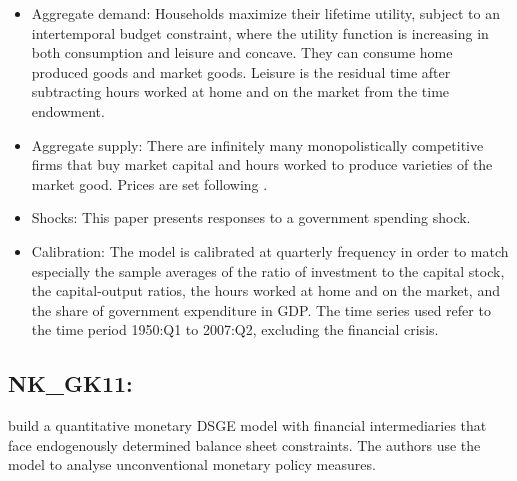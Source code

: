 \documentclass[11pt,a4paper]{article}
\begin{document}
	\begin{itemize}
		\item Aggregate  demand: Households maximize their lifetime utility, subject to an intertemporal budget constraint, where the utility function is increasing in both consumption and leisure and concave. They can consume home produced goods and market goods. Leisure is the residual time after subtracting hours worked at home and on the market from the time endowment.
		\item Aggregate  supply: There are infinitely many monopolistically competitive firms that buy market capital and hours worked to produce varieties of the market good. Prices are set following \cite{Calvo1983}.
		\item Shocks: This paper presents responses to a government spending shock.
		\item Calibration: The model is calibrated at quarterly frequency in order to match especially the sample averages of the ratio of investment to the capital stock, the capital-output ratios, the hours worked at home and on the market, and the share of government expenditure in GDP. The time series used refer to the time period 1950:Q1 to 2007:Q2, excluding the financial crisis.
	\end{itemize}
	
	
	
	\subsection{NK\_GK11: \texorpdfstring{\cite{GertlerKaradi2011}}{Gertler and Karadi (2011)}}
	\label{NKGK11}
	\cite{GertlerKaradi2011} build a quantitative monetary DSGE model with financial intermediaries that face endogenously determined balance sheet constraints. The authors use the model to analyse unconventional monetary policy measures.
	
\end{document}
